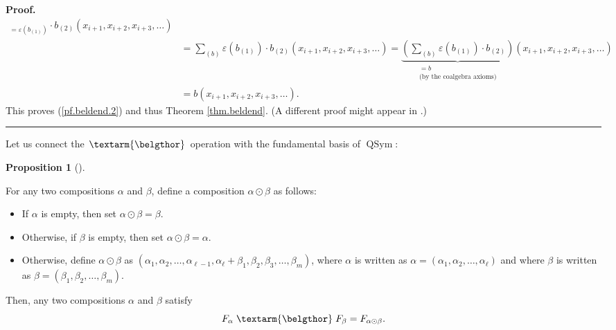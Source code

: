 \documentclass[numbers=enddot,12pt,final,onecolumn,notitlepage,abstracton]{scrartcl}%
\theoremstyle{definition}
\newtheorem{prop}[theo]{Proposition}
\newenvironment{proposition}[1][]
{\begin{prop}[#1]\begin{leftbar}}
{\end{leftbar}\end{prop}}
\newenvironment{proof}[1][Proof]{\noindent\textbf{#1.} }{\ \rule{0.5em}{0.5em}}
\newenvironment{noncompile}{}{}
\newcommand{\bel}{\left. \textarm{\belgthor} \right.}
\let\sumnonlimits\sum
\renewcommand{\sum}{\sumnonlimits\limits}
\begin{document}
\begin{noncompile}
\begin{proof}
\begin{align*}
{}_{=\varepsilon\left(  b_{\left(  1\right)  }\right)  }\cdot b_{\left(
2\right)  }\left(  x_{i+1},x_{i+2},x_{i+3},\ldots\right) \\
&  =\sum_{\left(  b\right)  }\varepsilon\left(  b_{\left(  1\right)  }\right)
\cdot b_{\left(  2\right)  }\left(  x_{i+1},x_{i+2},x_{i+3},\ldots\right)
=\underbrace{\left(  \sum_{\left(  b\right)  }\varepsilon\left(  b_{\left(
1\right)  }\right)  \cdot b_{\left(  2\right)  }\right)  }%
_{\substack{=b\\\text{(by the coalgebra axioms)}}}\left(  x_{i+1}%
,x_{i+2},x_{i+3},\ldots\right) \\
&  =b\left(  x_{i+1},x_{i+2},x_{i+3},\ldots\right)  .
\end{align*}
This proves (\ref{pf.beldend.2}) and thus Theorem \ref{thm.beldend}. (A
different proof might appear in \cite{Gri-gammapart}.)
\end{proof}
\end{noncompile}

Let us connect the $\bel $ operation with the fundamental basis of
$\operatorname*{QSym}$:

\begin{proposition}
\label{prop.bel.F}For any two compositions $\alpha$ and $\beta$, define a
composition $\alpha\odot\beta$ as follows:

\begin{itemize}
\item If $\alpha$ is empty, then set $\alpha\odot\beta=\beta$.

\item Otherwise, if $\beta$ is empty, then set $\alpha\odot\beta=\alpha$.

\item Otherwise, define $\alpha\odot\beta$ as $\left(  \alpha_{1},\alpha
_{2},\ldots,\alpha_{\ell-1},\alpha_{\ell}+\beta_{1},\beta_{2},\beta_{3}%
,\ldots,\beta_{m}\right)  $, where $\alpha$ is written as $\alpha=\left(
\alpha_{1},\alpha_{2},\ldots,\alpha_{\ell}\right)  $ and where $\beta$ is
written as $\beta=\left(  \beta_{1},\beta_{2},\ldots,\beta_{m}\right)  $.
\end{itemize}

Then, any two compositions $\alpha$ and $\beta$ satisfy%
\[
F_{\alpha}\bel F_{\beta}=F_{\alpha\odot\beta}.
\]

\end{proposition}
\end{document}
